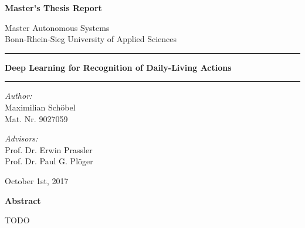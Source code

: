 \documentclass[a4paper, 11pt, listof=totoc, bibliography=totoc]{scrartcl}
\begin{document}
\thispagestyle{empty}
\begin{center}
\LARGE
\textbf{Master's Thesis Report} \\
\vspace{.5cm}

\large
Master Autonomous Systems \\
Bonn-Rhein-Sieg University of Applied Sciences\\
\vspace{1cm}

\vspace{-0.75\baselineskip}\rule{\linewidth}{1.5pt}
\LARGE\textbf{Deep Learning for Recognition of Daily-Living Actions} \\
\vspace{-0.5\baselineskip}\rule{\linewidth}{1.5pt}

\vspace{1cm}

\normalsize
\textit{Author:}\\
Maximilian Schöbel\\
Mat. Nr. 9027059
\bigskip

\textit{Advisors:}\\
Prof. Dr. Erwin Prassler\\
Prof. Dr. Paul G. Plöger\\
\bigskip

October 1st, 2017

\vfill

\textbf{Abstract}
\end{center}
\small

TODO

\newpage

%

\thispagestyle{empty}
\footnotesize
\tableofcontents
\normalsize

\newpage

%
%
%
%
%


%




\begin{appendix}


\end{appendix}

\newpage

\end{document}
